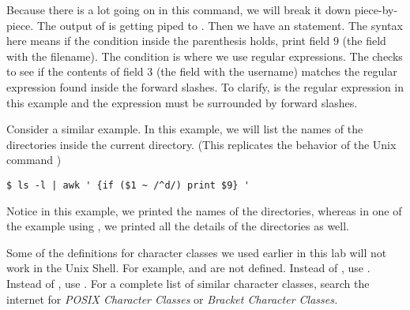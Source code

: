 Because there is a lot going on in this command, we will break it down piece-by-piece.
The output of  is getting piped to . Then we have an  statement.
The syntax here means if the condition inside the parenthesis holds, print field $9$ (the field with the filename). The condition is where we use regular expressions.
The \li{\~} checks to see if the contents of field $3$ (the field with the username) matches the regular expression found inside the forward slashes.
To clarify,  is the regular expression in this example and the expression must be surrounded by forward slashes.

Consider a similar example.
In this example, we will list the names of the directories inside the current directory.
(This replicates the behavior of the Unix command )

\begin{lstlisting}
$ ls -l | awk ' {if ($1 ~ /^d/) print $9} '
\end{lstlisting}

Notice in this example, we printed the names of the directories, whereas in one of the example using , we printed all the details of the directories as well.

\begin{warn}
Some of the definitions for character classes we used earlier in this lab will not work in the Unix Shell. For example, \li{\\w} and \li{\\d} are not defined. Instead of \li{\\w}, use \li{[[:alnum:]]}. Instead of \li{\\d}, use \li{[[:digit:]]}. For a complete list of similar character classes, search the internet for \emph{POSIX Character Classes} or \emph{Bracket Character Classes.}
\end{warn}

